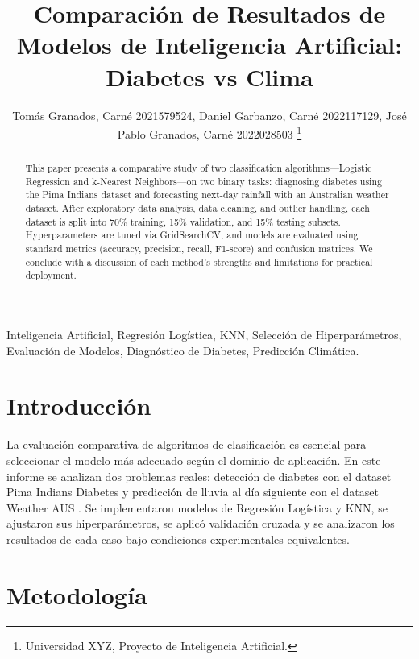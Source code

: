\documentclass[journal]{IEEEtran}
\begin{document}
\title{Comparación de Resultados de Modelos de Inteligencia Artificial: Diabetes vs Clima}
\author{%
  Tomás Granados, Carné 2021579524,%
  \quad Daniel Garbanzo, Carné 2022117129,%
  \quad José Pablo Granados, Carné 2022028503%
  \thanks{Universidad XYZ, Proyecto de Inteligencia Artificial.}%
}%
\maketitle

\begin{abstract}
This paper presents a comparative study of two classification algorithms—Logistic Regression and k-Nearest Neighbors—on two binary tasks: diagnosing diabetes using the Pima Indians dataset and forecasting next-day rainfall with an Australian weather dataset. After exploratory data analysis, data cleaning, and outlier handling, each dataset is split into 70\% training, 15\% validation, and 15\% testing subsets. Hyperparameters are tuned via GridSearchCV, and models are evaluated using standard metrics (accuracy, precision, recall, F1-score) and confusion matrices. We conclude with a discussion of each method’s strengths and limitations for practical deployment.
\end{abstract}

\begin{IEEEkeywords}
Inteligencia Artificial, Regresión Logística, KNN, Selección de Hiperparámetros, Evaluación de Modelos, Diagnóstico de Diabetes, Predicción Climática.
\end{IEEEkeywords}

\section{Introducción}
La evaluación comparativa de algoritmos de clasificación es esencial para seleccionar el modelo más adecuado según el dominio de aplicación. En este informe se analizan dos problemas reales: detección de diabetes con el dataset Pima Indians Diabetes \cite{smith1988pima} y predicción de lluvia al día siguiente con el dataset Weather AUS \cite{bishop2006weather}. Se implementaron modelos de Regresión Logística y KNN, se ajustaron sus hiperparámetros, se aplicó validación cruzada y se analizaron los resultados de cada caso bajo condiciones experimentales equivalentes.

\section{Metodología}
\end{document}
